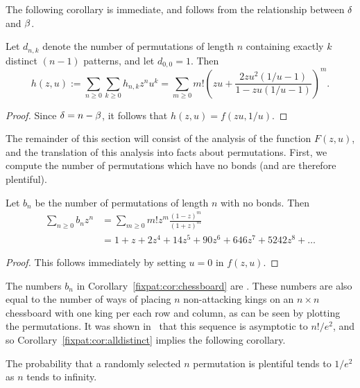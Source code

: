   The following corollary is immediate, and follows from the relationship
  between $\delta$ and $\beta$. 
    
  \begin{corollary} \label{fixpat:cor:gfn2}
    Let $d_{n,k}$ denote the number of permutations of length $n$ containing
    exactly $k$ distinct $(n-1)$ patterns, and let $d_{0,0} = 1$. Then 
    $$ h(z,u) :=  \sum_{n \geq 0}\sum_{ k \geq 0} h_{n,k} z^n u^k = 
      \sum_{m \geq 0}  m! \left( zu + 
      \frac{2zu^2 (1/u - 1)}{1 - zu(1/u - 1)}\right)^m.$$
  \end{corollary}
  \begin{proof}
    Since $\delta = n - \beta$, it follows that $h(z,u) = f(zu, 1/u)$. 
  \end{proof}

  The remainder of this section will consist of the analysis of the function
  $F(z,u)$, and the translation of this analysis into facts about
  permutations. 
  First, we compute the number of permutations which have no bonds (and
  are therefore plentiful). 

  \begin{proposition} \label{fixpat:cor:chessboard}
    Let $b_n$ be the number of permutations of length $n$ with no bonds. Then 
    $$ \begin{aligned} 
     \sum_{n \geq 0} b_n z^n 
       &= \sum_{m \geq 0} m! z^m \frac{(1 - z)^m}{(1 + z)^m} \\
       &= 1 + z + 2z^4 + 14z^5 + 90z^6 + 646z^7 + 5242z^8 + \dots 
    \end{aligned} $$
  \end{proposition}
  \begin{proof}
    This follows immediately by setting $u = 0$ in $f(z,u)$. 
  \end{proof}

  The numbers $b_n$ in Corollary~\ref{fixpat:cor:chessboard} are 
  . These numbers are also equal to the number of ways of
  placing $n$ non-attacking kings on an $n \times n$ chessboard with one king
  per each row and column, as can be seen by plotting the permutations. It
  was shown in~\cite{Tauraso2006} that this sequence is asymptotic to
  $n!/e^2$, and so Corollary~\ref{fixpat:cor:alldistinct} implies the
  following corollary. 

  \begin{corollary}
    The probability that a randomly selected $n$ permutation is plentiful tends
    to $1/e^2$ as $n$ tends to infinity. 
  \end{corollary}

